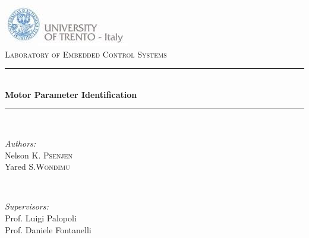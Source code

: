 \begin{titlepage}

\newcommand{\HRule}{\rule{\linewidth}{0.5mm}} %

\center
 
 

\includegraphics{images/logo.png}\\[1cm]




\textsc{\Large Laboratory of Embedded Control Systems}\\[0.5cm] 


\HRule \\[0.4cm]
{ \huge \bfseries \LEGO Motor Parameter Identification}\\[0.4cm] 
\HRule \\[1.5cm]
 

\begin{minipage}{0.4\textwidth}
\begin{flushleft} \large
\emph{Authors:}\\
Nelson K. \textsc{Psenjen}\\
Yared S.\textsc{Wondimu} %
\end{flushleft}
\end{minipage}
~
\begin{minipage}{0.4\textwidth}
\begin{flushright} \large
\emph{Supervisors:} \\
Prof. Luigi Palopoli  \\
Prof. Daniele Fontanelli\\



\end{flushright}
\end{minipage}
\end{titlepage}
